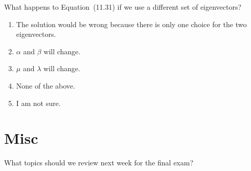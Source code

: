 \documentclass[t, 14pt]{beamer}
\begin{document}
\begin{frame}
  What happens to Equation~(11.31) if we use a different set of eigenvectors?

  \begin{enumerate}
    \item The solution would be wrong because there is only one choice for the two eigenvectors.
    \item \(\alpha\) and \(\beta\) will change.
    \item \(\mu\) and \(\lambda\) will change.
    \item None of the above.
    \item I am not sure.
  \end{enumerate}
\end{frame}

\section{Misc}

\begin{frame}[c]
  What topics should we review next week for the final exam?
\end{frame}
\end{document}
